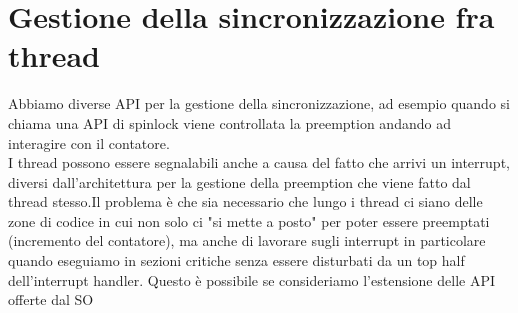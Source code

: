 \documentclass[12pt, oneside]{extbook}
\begin{document}
\section{Gestione della sincronizzazione fra thread}
Abbiamo diverse API per la gestione della sincronizzazione, ad esempio quando si chiama una API di spinlock viene controllata la preemption andando ad interagire con il contatore.\\I thread possono essere segnalabili anche a causa del fatto che arrivi un interrupt, diversi dall'architettura per la gestione della preemption che viene fatto dal thread stesso.Il problema è che sia necessario che lungo i thread ci siano delle zone di codice in cui non solo ci "si mette a posto" per poter essere preemptati (incremento del contatore), ma anche di lavorare sugli interrupt in particolare quando eseguiamo in sezioni critiche senza essere disturbati da un top half dell'interrupt handler. Questo è possibile se consideriamo l'estensione delle API offerte dal SO
\end{document}
